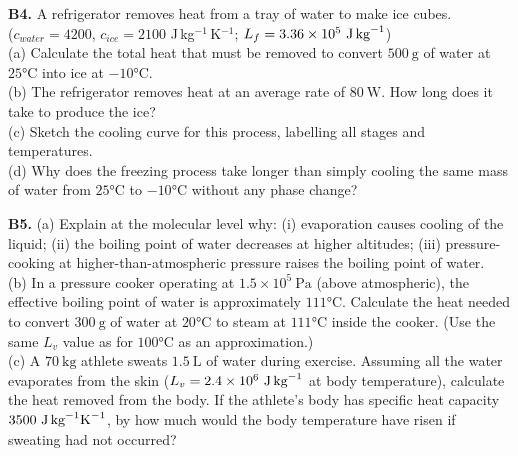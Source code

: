 \begin{exercisebox}[15]
\vspace{0.4cm}

\textbf{B4.} A refrigerator removes heat from a
tray of water to make ice cubes.\\
($c_{water} = 4200$, $c_{ice} = 2100$
J\,kg$^{-1}$\,K$^{-1}$;
$L_f = 3.36\times10^5\ \text{J\,kg}^{-1}$)\\[4pt]
(a) Calculate the total heat that must be removed
to convert $500\ \text{g}$ of water at $25°\text{C}$
into ice at $-10°\text{C}$.\\
(b) The refrigerator removes heat at an average
rate of $80\ \text{W}$. How long does it take to
produce the ice?\\
(c) Sketch the cooling curve for this process,
labelling all stages and temperatures.\\
(d) Why does the freezing process take longer than
simply cooling the same mass of water from
$25°\text{C}$ to $-10°\text{C}$ without any
phase change?
\hfill{}

\vspace{0.4cm}

\textbf{B5.} (a) Explain at the molecular level
why:
(i) evaporation causes cooling of the liquid;
(ii) the boiling point of water decreases at
higher altitudes;
(iii) pressure-cooking at higher-than-atmospheric
pressure raises the boiling point of water.\\[4pt]
(b) In a pressure cooker operating at
$1.5\times10^5\ \text{Pa}$ (above atmospheric),
the effective boiling point of water is approximately
$111°\text{C}$.
Calculate the heat needed to convert $300\ \text{g}$
of water at $20°\text{C}$ to steam at $111°\text{C}$
inside the cooker. (Use the same $L_v$ value as
for $100°\text{C}$ as an approximation.)\\[4pt]
(c) A $70\ \text{kg}$ athlete sweats
$1.5\ \text{L}$ of water during exercise.
Assuming all the water evaporates from the skin
($L_v = 2.4\times10^6\ \text{J\,kg}^{-1}$
at body temperature), calculate the heat removed
from the body. If the athlete's body has specific
heat capacity $3500\ \text{J\,kg}^{-1}\text{K}^{-1}$,
by how much would the body temperature have risen
if sweating had not occurred?
\hfill{}

\end{exercisebox}
